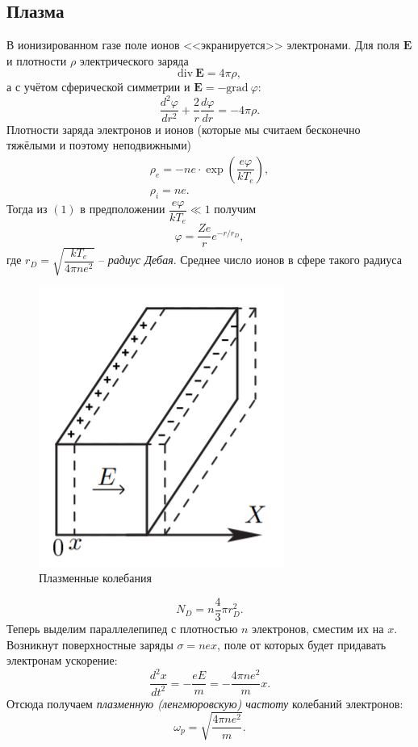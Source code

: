 \subsection*{Плазма}
В ионизированном газе поле ионов <<экранируется>> электронами. Для поля $\mathbf{E}$ и плотности $\rho$ электрического заряда
$$
\text{div}~\mathbf{E} = 4 \pi \rho,
$$
а с учётом сферической симметрии и $\mathbf{E} = -\text{grad}~\varphi$:
\begin{equation}
    \dfrac{d^2 \varphi}{dr^2}+\dfrac{2}{r}\dfrac{d\varphi}{dr}=-4\pi \rho.
\end{equation}
Плотности заряда электронов и ионов (которые мы считаем бесконечно тяжёлыми и поэтому неподвижными)
\begin{equation}
    \begin{array}{c}
        \rho_e = -ne \cdot \exp\left(\dfrac{e\varphi}{kT_e}\right),\\
        \rho_i = ne.
    \end{array}
\end{equation}
Тогда из $(1)$ в предположении $\dfrac{e\varphi}{kT_e} \ll 1$ получим
\begin{equation}
    \varphi = \dfrac{Ze}{r}e^{-r/r_D},
\end{equation}
где $r_D = \sqrt{\dfrac{kT_e}{4\pi n e^2}}$ -- \textit{радиус Дебая}. Среднее число ионов в сфере такого радиуса 
\begin{figure}
    \includegraphics[scale=0.5]{images/figure.png}
    \caption{Плазменные колебания}
\end{figure}  
\begin{equation}
    N_D = n\dfrac{4}{3}\pi r_D^2.
\end{equation}
Теперь выделим параллелепипед с плотностью $n$ электронов, сместим их на $x$. Возникнут поверхностные заряды $\sigma = nex$, поле от которых будет придавать электронам ускорение:
$$
\dfrac{d^2x}{dt^2}=-\dfrac{eE}{m}=-\dfrac{4\pi n e^2}{m}x.
$$ 
Отсюда получаем \textit{плазменную (ленгмюровскую) частоту} колебаний электронов:
\begin{equation}
    \omega_p = \sqrt{\dfrac{4\pi ne^2}{m}}.
\end{equation}
